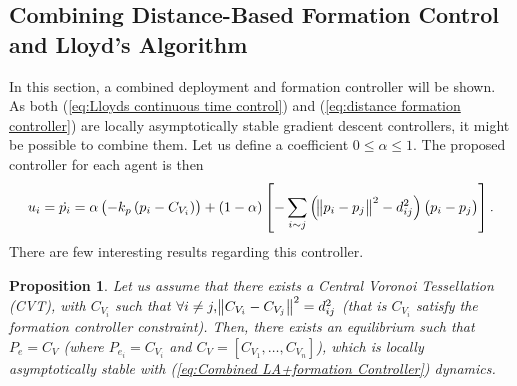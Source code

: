 \documentclass{iacas}
\newtheorem{proposition}{Proposition}
\begin{document}
\subsection{Combining Distance-Based Formation Control and Lloyd's Algorithm}
In this section, a combined deployment and formation controller will be shown. As both (\ref{eq:Lloyds continuous time control}) and (\ref{eq:distance formation controller}) are locally asymptotically stable gradient descent controllers, it might be possible to combine them. Let us define a coefficient $0 \leq \alpha \leq 1$. The proposed controller for each agent is then
\begin{equation}
    u_{i} = \dot{p_{i}} = \alpha \left(-k_{p}\left( p_i -C_{V_{i}} \right)\right) +
    \left( 1-\alpha \right)\left[-\sum_{i \sim j} \left( \norm{p_{i} - p_{j}}^{2} - d_{ij}^2 \right) \left( p_{i} - p_{j} \right)  \right].
    \label{eq:Combined LA+formation Controller}
\end{equation}
There are few interesting results regarding this controller.

\begin{proposition}
    Let us assume that there exists a Central Voronoi Tessellation (CVT), with $C_{V_{i}}$ such that $\forall i \neq j, \norm{C_{V_{i}} - C_{V_{j}}}^{2} = d_{ij}^{2}$ (that is $C_{V_{i}}$ satisfy the formation controller constraint). Then, there exists an equilibrium such that $P_e = C_V$ (where $P_{e_i} = C_{V_{i}}$ and $C_V = \left[C_{V_1}, \ldots, C_{V_n} \right]$), which is locally asymptotically stable with (\ref{eq:Combined LA+formation Controller}) dynamics.
    \label{proposition 1}
\end{proposition}
\end{document}
